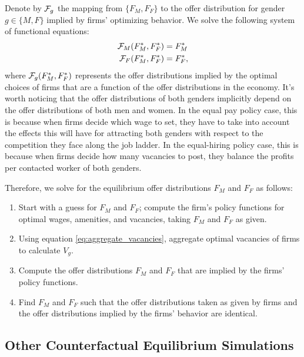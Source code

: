 Denote by ${\cal{F}}_g$ the mapping from $\{ F_{M}, F_{F}\}$ to the offer distribution for gender $g \in \{ M, F \}$ implied by firms' optimizing behavior. We solve the following system of functional equations:
%
\begin{align}
    {\cal{F}}_{M}(F_{M}^{*},F_{F}^{*}) & = F_{M}^{*} \\
    {\cal{F}}_{F}(F_{M}^{*},F_{F}^{*}) & = F_{F}^{*},
\end{align}
%
where ${\cal{F}}_g(F_{M}^{*}, F_{F}^{*})$ represents the offer distributions implied by the optimal choices of firms that are a function of the offer distributions in the economy. It's worth noticing that the offer distributions of both genders implicitly depend on the offer distributions of both men and women. In the equal pay policy case, this is because when firms decide which wage to set, they have to take into account the effects this will have for attracting both genders with respect to the competition they face along the job ladder. In the equal-hiring policy case, this is because when firms decide how many vacancies to post, they balance the profits per contacted worker of both genders.

Therefore, we solve for the equilibrium offer distributions $F_{M}$ and $F_{F}$ as follows:
%
\begin{enumerate}
  \item Start with a guess for $F_{M}$ and $F_{F}$; compute the firm's policy functions for optimal wages, amenities, and vacancies, taking $F_{M}$ and $F_{F}$ as given.
	\item Using equation \eqref{eq:aggregate_vacancies}, aggregate optimal vacancies of firms to calculate $V_g$.
  \item Compute the offer distributions $F_{M}$ and $F_{F}$ that are implied by the firms' policy functions.
  \item Find $F_{M}$ and $F_{F}$ such that the offer distributions taken as given by firms and the offer distributions implied by the firms' behavior are identical.
\end{enumerate}
%


\clearpage
\subsection{Other Counterfactual Equilibrium Simulations
\label{app:counterfactuals_all}}

